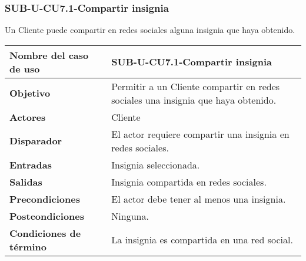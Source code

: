 \subsubsection{SUB-U-CU7.1-Compartir insignia}\label{SUB-U-CU7.1}
Un Cliente puede compartir en redes sociales alguna insignia que haya obtenido.

\begin{longtable}{|J{5cm}|J{10.3cm}|}
	\hline
	\textbf{Nombre del caso de uso} &
		SUB-U-CU7.1-Compartir insignia \\ \hline
	\textbf{Objetivo} &
		Permitir a un Cliente compartir en redes sociales una insignia que haya obtenido. \\ \hline
	\textbf{Actores} &
		Cliente \\ \hline 
	\textbf{Disparador} & 
		El actor requiere compartir una insignia en redes sociales. \\ \hline 
	\textbf{Entradas} & Insignia seleccionada.
		\\ \hline 
	\textbf{Salidas} & Insignia compartida en redes sociales.
		\\ \hline
	\textbf{Precondiciones} &
		El actor debe tener al menos una insignia.\\ \hline
	\textbf{Postcondiciones} & Ninguna.
		\\ \hline
	\textbf{Condiciones de término} & La insignia es compartida en una red social.
		

\end{longtable}
